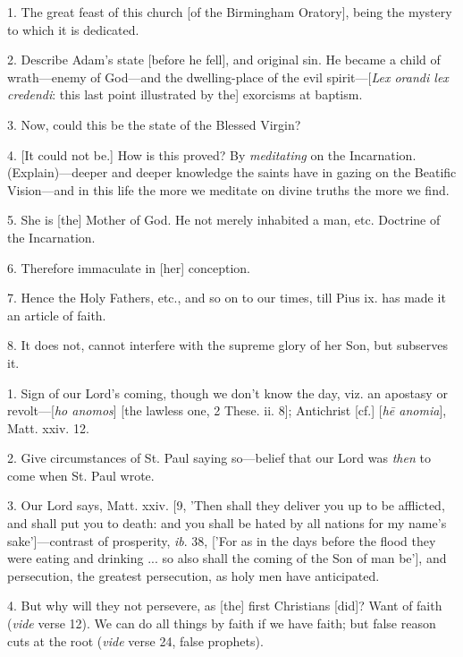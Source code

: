 
1. The great feast of this church [of the
Birmingham Oratory], being the mystery to which it is dedicated.

2. Describe Adam's state [before he fell], and
original sin. He became a child of wrath—enemy of God—and the
dwelling-place of the evil spirit—[\emph{Lex orandi lex credendi}:
this last point illustrated by the] exorcisms at baptism.

3. Now, could this be the state of the Blessed
Virgin?

4. [It could not be.] How is this proved? By \emph{meditating}
on the Incarnation. (Explain)—deeper and deeper knowledge the saints
have in gazing on the Beatific Vision—and in this life the more we
meditate on divine truths the more we find.

5. She is [the] Mother of God. He not merely
inhabited a man, etc. Doctrine of the Incarnation.

6. Therefore immaculate in [her] conception.

7. Hence the Holy Fathers, etc., and so on to our
times, till Pius ix. has made it an article of faith.

8. It does not, cannot interfere with the supreme
glory of her Son, but subserves it.


1. Sign of our Lord's coming, though we don't
know the day, viz. an apostasy or revolt—[\emph{ho anomos}] [the
lawless one, 2 These. ii. 8]; Antichrist [cf.] [\emph{h\={e} anomia}],
Matt. xxiv. 12.

2. Give circumstances of St. Paul saying
so—belief that our Lord was \emph{then} to come when St. Paul wrote.

3. Our Lord says, Matt. xxiv. [9, 'Then shall
they deliver you up to be afflicted, and shall put you to death: and
you shall be hated by all nations for my name's sake']—contrast of
prosperity, \emph{ib}. 38, ['For as in the days before the flood they
were eating and drinking ... so also shall the coming of the Son of
man be'], and persecution, the greatest persecution, as holy men have
anticipated.

4. But why will they not persevere, as [the]
first Christians [did]? Want of faith (\emph{vide} verse 12). We can
do all things by faith if we have faith; but false reason cuts at the
root (\emph{vide} verse 24, false prophets).

